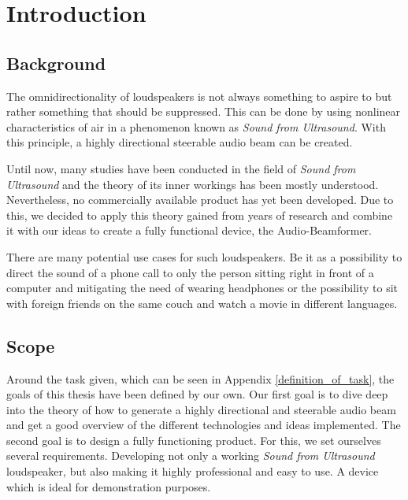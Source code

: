 \newcommand{\package}{\emph}

\chapter{Introduction}
\section{Background}
The omnidirectionality of loudspeakers is not always something to aspire to but rather something that should be suppressed. This can be done by using nonlinear characteristics of air in a phenomenon known as \textit{Sound from Ultrasound}. With this principle, a highly directional steerable audio beam can be created. 

Until now, many studies have been conducted in the field of \textit{Sound from Ultrasound} and the theory of its inner workings has been mostly understood. Nevertheless, no commercially available product has yet been developed. Due to this, we decided to apply this theory gained from years of research and combine it with our ideas to create a fully functional device, the Audio-Beamformer. 

There are many potential use cases for such loudspeakers. Be it as a possibility to direct the sound of a phone call to only the person sitting right in front of a computer and mitigating the need of wearing headphones or the possibility to sit with foreign friends on the same couch and watch a movie in different languages. 
\section{Scope}
Around the task given, which can be seen in Appendix \ref{definition_of_task}, the goals of this thesis have been defined by our own.
Our first goal is to dive deep into the theory of how to generate a highly directional and steerable audio beam and get a good overview of the different technologies and ideas implemented. 
The second goal is to design a fully functioning product. For this, we set ourselves several requirements. Developing not only a working \textit{Sound from Ultrasound} loudspeaker, but also making it highly professional and easy to use. A device which is ideal for demonstration purposes.
\newpage

